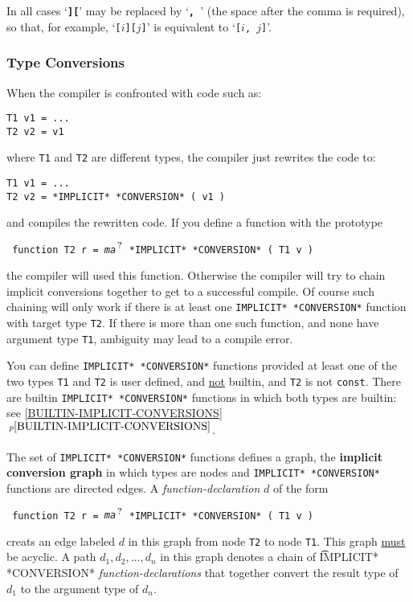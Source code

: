 \documentclass[12pt]{article}
\newcommand{\TT}[1]{{\tt \bfseries #1}}
\newcommand{\QMARK}{{$^{\,\mbox{\footnotesize ?}}$}}
\newcommand{\key}[1]{{\rm \bfseries #1}}
\newcommand{\itemref}[1]{\ref{#1}$\,^{p\pageref{#1}}$}
\newenvironment{indpar}[1][0.3in]%
	{\begin{list}{}%
		     {\setlength{\itemsep}{0in}%
		      \setlength{\topsep}{0in}%
		      \setlength{\parsep}{1ex}%
		      \setlength{\labelwidth}{#1}%
		      \setlength{\leftmargin}{#1}%
		      \addtolength{\leftmargin}{\labelsep}}%
	 \item}%
	{\end{list}}
\begin{document}
In all cases `\TT{][}' may be replaced by `\TT{,~}' (the space
after the comma is required), so that,
for example, `{\tt [$i$][$j$]}' is equivalent to `{\tt [$i$, $j$]}'.

\subsubsection{Type Conversions}
\label{TYPE-CONVERSIONS}

When the compiler is confronted with code such as:
\begin{indpar}\begin{verbatim}
T1 v1 = ...
T2 v2 = v1
\end{verbatim}\end{indpar}
where {\tt T1} and {\tt T2} are different types,
the compiler just rewrites the code to:
\begin{indpar}\begin{verbatim}
T1 v1 = ...
T2 v2 = *IMPLICIT* *CONVERSION* ( v1 )
\end{verbatim}\end{indpar}
and compiles the rewritten code.  If you define a function
with the prototype
\begin{indpar} \tt
function T2 r = {\em ma}\QMARK{} *IMPLICIT* *CONVERSION* ( T1 v )
\end{indpar}
the compiler will used this function.  Otherwise the compiler
will try to chain implicit conversions together to get to a
successful compile.  Of course such chaining will only work
if there is at least one {\tt *IMPLICIT* *CONVERSION*} function with
target type {\tt T2}.  If there is more than one such function,
and none have argument type {\tt T1}, ambiguity may lead to a compile error.

You can define {\tt *IMPLICIT* *CONVERSION*} functions
provided at least one of the two types {\tt T1} and {\tt T2}
is user defined, and \underline{not} builtin, and {\tt T2} is not {\tt const}.
There are builtin {\tt *IMPLICIT* *CON\-VER\-SION*} functions in
which both types are builtin: see \itemref{BUILTIN-IMPLICIT-CONVERSIONS}.

The set of {\tt *IMPLICIT* *CONVERSION*} functions defines
a graph, the \key{implicit conversion graph}\label{IMPLICIT-CONVERSION-GRAPH}
in which types are nodes and {\tt *IMPLICIT* *CONVERSION*}
functions are directed edges.
A {\em function-declaration} $d$ of the form
\begin{indpar} \tt
function T2 r = {\em ma}\QMARK{} *IMPLICIT* *CONVERSION* ( T1 v )
\end{indpar}
creats an edge labeled $d$ in this graph from node {\tt T2} to node
{\tt T1}.
This graph \underline{must} be
acyclic.  A path $d_1,d_2,\ldots,d_n$ in this graph denotes a chain
of {\t *IMPLICIT* *CONVERSION*} {\em function-declarations} that together
convert the result type of $d_1$ to the argument type of $d_n$.
\end{document}
